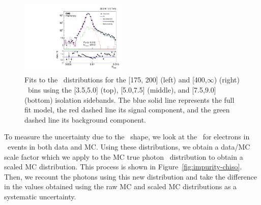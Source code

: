 \begin{figure}[htbp]
  \includegraphics[width=0.45\textwidth]{Calibration/Figures/pvsf/ssfit_400_medium_far_logy.pdf}
  \caption{
    Fits to the \sieie\ distributions for the [175, 200] (left) and [400,$\infty$) (right) \pt\ bins using the [3.5,5.0] (top), [5.0,7.5] (middle), and [7.5,9.0] (bottom) isolation sidebands.
      The blue solid line represents the full fit model, the red dashed line its signal component, and the green dashed line its background component.
    }
  \label{fig:impurity-sideband}
\end{figure}

To measure the uncertainty due to the \ICH\ shape, we look at the \ICH\ for electrons in
\Zee\ events in both data and MC. 
Using these distributions, we obtain a data/MC scale factor which we apply to the MC true photon \ICH\ distribution to obtain a scaled MC distribution. 
This process is shown in Figure~\ref{fig:impurity-chiso}. 
Then, we recount the photons using this new distribution and take the difference in the values obtained using the raw MC and scaled MC distributions as a systematic uncertainty.

